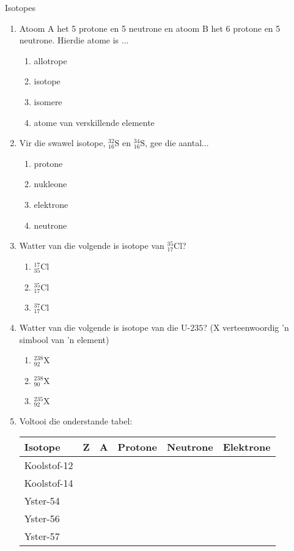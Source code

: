 \begin{exercises}{Isotopes}
{
\nopagebreak
\begin{enumerate}[noitemsep, label=\textbf{\arabic*}. ] 

\item Atoom A het 5 protone en 5 neutrone en atoom B het 6 protone en 5 neutrone. Hierdie atome is ...
\begin{enumerate}[noitemsep, label=\textbf{\alph*}. ] 
\item allotrope
\item isotope
\item isomere
\item atome van verskillende elemente
\end{enumerate}

\item Vir die swawel isotope, $_{16}^{32}\text{S}$ en $_{16}^{34}\text{S}$, gee die aantal...
\begin{enumerate}[noitemsep, label=\textbf{\alph*}. ] 
\item protone
\item nukleone
\item elektrone
\item neutrone
\end{enumerate}

\item Watter van die volgende is isotope van $_{17}^{35}\text{Cl}$?
\begin{enumerate}[noitemsep, label=\textbf{\alph*}. ] 
\item $_{35}^{17}\text{Cl}$
\item $_{17}^{35}\text{Cl}$
\item $_{17}^{37}\text{Cl}$
\end{enumerate}

\item Watter van die volgende is isotope van die $\text{U-}235$? (X verteenwoordig 'n simbool van 'n element)
\begin{enumerate}[noitemsep, label=\textbf{\alph*}. ] 
\item $_{92}^{238}\text{X}$
\item $_{90}^{238}\text{X}$
\item $_{92}^{235}\text{X}$
\end{enumerate}

\item Voltooi die onderstande tabel:
\begin{center}
\begin{tabular}{|p{2cm}|p{1cm}|p{1cm}|p{1.4cm}|p{1.4cm}|p{1.4cm}|}\hline
\textbf{Isotope} & \textbf{Z} & \textbf{A} & \textbf{Protone} & \textbf{Neutrone} & \textbf{Elektrone}\\\hline
Koolstof-12 & & & & & \\\hline
Koolstof-14 & & & & & \\\hline
Yster-54& & & & & \\\hline
Yster-56 & & & & & \\\hline
Yster-57 & & & & & \\\hline
\end{tabular}
\end{center}


\end{enumerate}}
\end{exercises}
